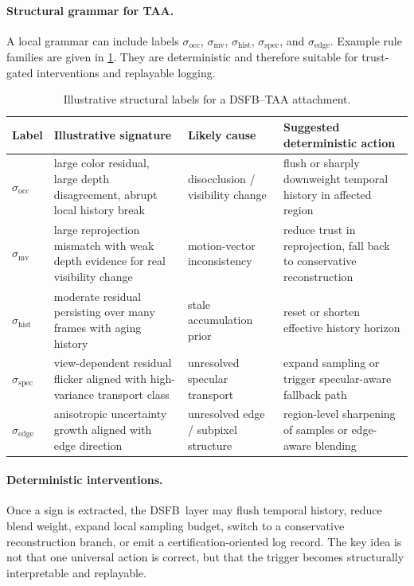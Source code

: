 \documentclass[11pt,letterpaper]{article}
\newcommand{\dsfb}{\textsc{DSFB}}
\theoremstyle{gcresult}
\theoremstyle{definition}
\begin{document}
\paragraph{Structural grammar for TAA.}
A local grammar can include labels $\sigma_{\mathrm{occ}}$, $\sigma_{\mathrm{mv}}$, $\sigma_{\mathrm{hist}}$, $\sigma_{\mathrm{spec}}$, and $\sigma_{\mathrm{edge}}$. Example rule families are given in \cref{tab:taa_rules}. They are deterministic and therefore suitable for trust-gated interventions and replayable logging.

\begin{table}[H]
\centering
\caption{Illustrative structural labels for a \dsfb--TAA attachment.}
\label{tab:taa_rules}
\begin{tabularx}{\textwidth}{>{\raggedright\arraybackslash}p{} >{\raggedright\arraybackslash}p{} >{\raggedright\arraybackslash}p{} >{\raggedright\arraybackslash}X}
\toprule
\textbf{Label} & \textbf{Illustrative signature} & \textbf{Likely cause} & \textbf{Suggested deterministic action} \\
\midrule
$\sigma_{\mathrm{occ}}$ & large color residual, large depth disagreement, abrupt local history break & disocclusion / visibility change & flush or sharply downweight temporal history in affected region \\
$\sigma_{\mathrm{mv}}$ & large reprojection mismatch with weak depth evidence for real visibility change & motion-vector inconsistency & reduce trust in reprojection, fall back to conservative reconstruction \\
$\sigma_{\mathrm{hist}}$ & moderate residual persisting over many frames with aging history & stale accumulation prior & reset or shorten effective history horizon \\
$\sigma_{\mathrm{spec}}$ & view-dependent residual flicker aligned with high-variance transport class & unresolved specular transport & expand sampling or trigger specular-aware fallback path \\
$\sigma_{\mathrm{edge}}$ & anisotropic uncertainty growth aligned with edge direction & unresolved edge / subpixel structure & region-level sharpening of samples or edge-aware blending \\
\bottomrule
\end{tabularx}
\end{table}

\paragraph{Deterministic interventions.}
Once a sign is extracted, the \dsfb\ layer may flush temporal history, reduce blend weight, expand local sampling budget, switch to a conservative reconstruction branch, or emit a certification-oriented log record. The key idea is not that one universal action is correct, but that the trigger becomes structurally interpretable and replayable.
\end{document}
